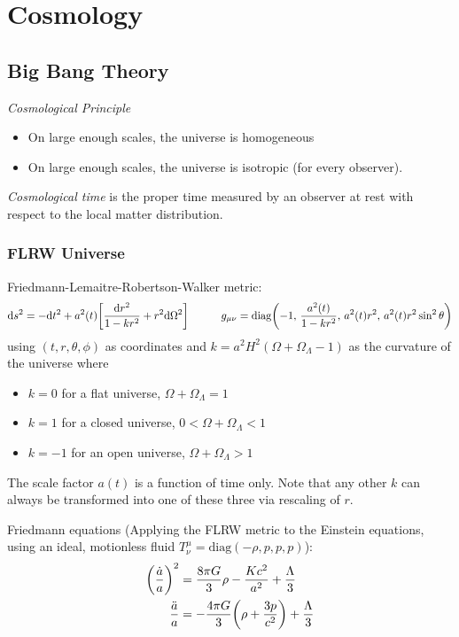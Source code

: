 \section{Cosmology}
	\subsection{Big Bang Theory}
		\emph{Cosmological Principle}
		\begin{itemize}
			\item On large enough scales, the universe is homogeneous
			\item On large enough scales, the universe is isotropic (for every observer).
		\end{itemize}

		\noindent
		\emph{Cosmological time} is the proper time measured by an observer at rest with respect to the local matter distribution.

		\subsubsection{FLRW Universe}
			Friedmann-Lemaitre-Robertson-Walker metric:
			\begin{equation}
				\dd s^2 = -\dd t^2 + a^2(t) \qty[\frac{\dd r^2}{1-kr^2} + r^2 \dd \Omega^2]
				\hspace{30pt}
				g_{\mu\nu} = \mathrm{diag}\qty(-1,\, \frac{a^2(t)}{1-kr^2},\, a^2(t) r^2,\, a^2(t) r^2 \sin^2 \theta)
			\end{equation}
			using $(t, r, \theta, \phi)$ as coordinates and $k = a^2 H^2 ( \Omega + \Omega_\Lambda - 1)$ as the curvature of the universe where
			\begin{itemize}
				\item $k=0$ for a flat universe, \ie $\Omega + \Omega_\Lambda = 1$
				\item $k=1$ for a closed universe, \ie $0 < \Omega + \Omega_\Lambda < 1$
				\item $k=-1$ for an open universe, \ie $\Omega + \Omega_\Lambda > 1$
			\end{itemize}
			The scale factor $a(t)$ is a function of time only. Note that any other $k$ can always be transformed into one of these three via rescaling of $r$.

			\noindent
			Friedmann equations (Applying the FLRW metric to the Einstein equations, using an ideal, motionless fluid $T^\mu_\nu = \text{diag}(-\rho, p, p, p)$):
			\begin{equation}
				\begin{aligned}
					\qty(\frac{\dot{a}}{a})^2 &= \frac{8 \pi G}{3} \rho - \frac{K c^2}{a^2} + \frac{\Lambda}{3} \\
					\frac{\ddot{a}}{a} &= -\frac{4 \pi G}{3} \qty(\rho + \frac{3p}{c^2}) + \frac{\Lambda}{3} \\
				\end{aligned}
			\end{equation}


